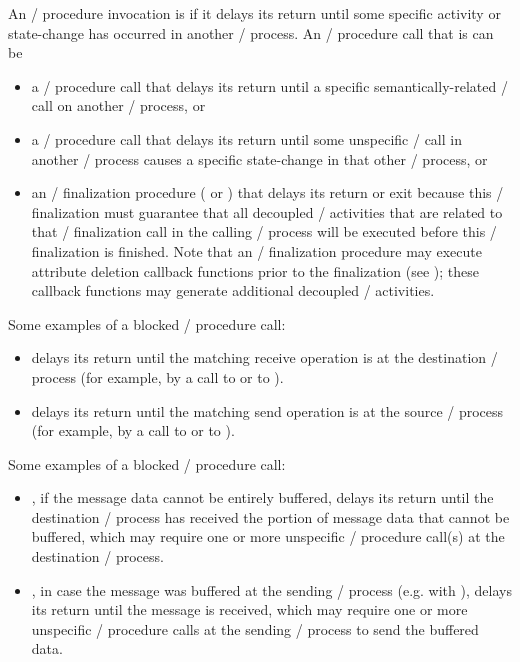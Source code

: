 An \MPI/ procedure invocation is
if it delays its return until some specific activity
or state-change has occurred in another \MPI/ process.
%
An \MPI/ procedure call that is  can be
\begin{itemize}
\item
  a 
  \MPI/ procedure call that delays its return until a specific
  semantically-related \MPI/ call on another \MPI/ process, or
\item
  a 
  \MPI/ procedure call that delays its return until some unspecific
  \MPI/ call in another \MPI/ process causes a specific state-change in
  that other \MPI/ process, or
\item
  an \MPI/ finalization procedure
  ( or )
  that delays its return or exit because this \MPI/ finalization must guarantee
  that all decoupled \MPI/ activities that are related to that \MPI/ finalization call
  in the calling \MPI/ process will be executed before this \MPI/ finalization is finished.
  Note that an \MPI/ finalization procedure may execute attribute deletion callback functions
  prior to the finalization (see );
  these callback functions may generate additional decoupled \MPI/ activities.
\end{itemize}
%
\noindent Some examples of a  blocked \MPI/ procedure call:
\begin{itemize}
\item
   delays its return until the matching receive operation
  is  at the destination \MPI/ process (for example, by a call
  to  or to ).
\item
   delays its return until the matching send operation
  is  at the source \MPI/ process (for example, by a call to
   or to ).
\end{itemize}
%
\noindent Some examples of a  blocked \MPI/ procedure call:
\begin{itemize}
\item
  , if the message data cannot be entirely buffered,
  delays its return until the destination \MPI/ process has received the
  portion of message data that cannot be buffered, which may require one
  or more unspecific \MPI/ procedure call(s) at the destination \MPI/ process.
\item
  , in case the message was buffered at the sending
  \MPI/ process (e.g. with ), delays its return until
  the message is received, which may require one or more unspecific \MPI/
  procedure calls at the sending \MPI/ process to send the buffered data.
\end{itemize}

